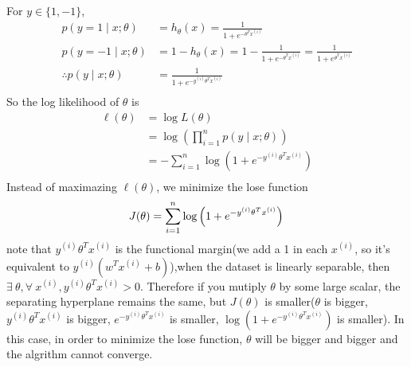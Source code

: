 \begin{answer}

    For $y\in\{1, -1\}$, 
    $$
    \begin{aligned}
        p(y = 1\mid x;\theta) &= h_\theta(x) = \frac{1}{1 + e^{-\theta^T x^{(i)}}}   \\
        p(y = -1\mid x;\theta) &= 1 - h_\theta(x) = 1 - \frac{1}{1 + e^{-\theta^T x^{(i)}}} = \frac{1}{1 + e^{\theta^T x^{(i)}}}\\
        \therefore p(y\mid x;\theta) &= \frac{1}{1 + e^{-y^{(i)} \theta^T x^{(i)}}}\\
    \end{aligned}
    $$
    So the log likelihood of $\theta$ is
    $$
    \begin{aligned}
        \ell(\theta) &= \log{L(\theta)}\\
        &= \log\left(\prod_{i=1}^n p(y\mid x;\theta)\right)\\
        &= -\sum_{i=1}^n\log\left(1 + e^{-y^{(i)}\theta^T x^{(i)}}\right) \\
    \end{aligned}
    $$
    Instead of maximazing $\ell(\theta)$, we minimize the lose function
    $$
    J(\theta) = \sum_{i=1}^n\log\left(1 + e^{-y^{(i)}\theta^T x^{(i)}}\right) \\
    $$
    note that $y^{(i)}\theta^T x^{(i)}$ is the functional margin(we add a 1 in each $x^{(i)}$, 
    so it's equivalent to $y^{(i)}(w^Tx^{(i)}+b)$),when the dataset is linearly separable, 
    then $\exists\ \theta,\forall\ x^{(i)}, y^{(i)}\theta^T x^{(i)} > 0$. Therefore if you mutiply 
    $\theta$ by some large scalar, the separating hyperplane remains the same, but $J(\theta)$ is 
    smaller($\theta$ is bigger, $y^{(i)}\theta^T x^{(i)}$ is bigger, $e^{-y^{(i)}\theta^T x^{(i)}}$ 
    is smaller, $\log(1 + e^{-y^{(i)}\theta^T x^{(i)}})$ is smaller). In this case, in order to 
    minimize the lose function, $\theta$ will be bigger and bigger and the algrithm cannot converge.


\end{answer}
